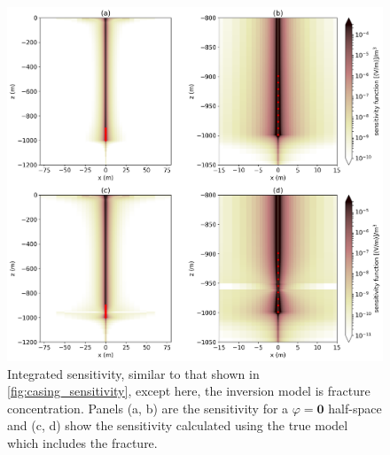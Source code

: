 \begin{figure}
    \begin{center}
    \includegraphics[width=\textwidth]{figures/inversion/casing_sensitivity_scemt.png}
    \end{center}
\caption{
    Integrated sensitivity, similar to that shown in \ref{fig:casing_sensitivity}, except here,
    the inversion model is fracture concentration.
    Panels (a, b) are the sensitivity for a $\varphi=\mathbf{0}$ half-space and
    (c, d) show the sensitivity calculated using the true model which includes the fracture.
}
\label{fig:casing_sensitivity_scemt}
\end{figure}
